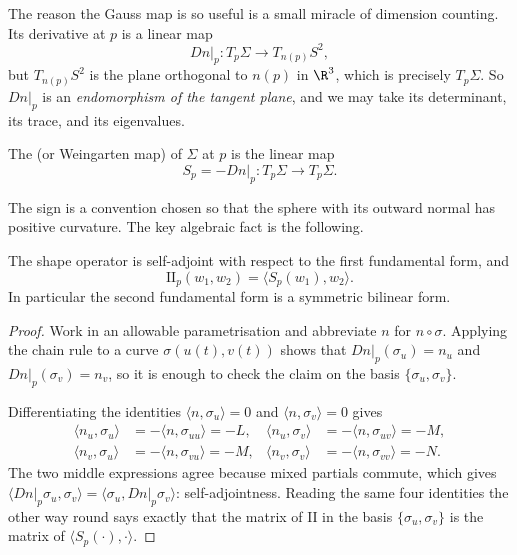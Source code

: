 The reason the Gauss map is so useful is a small miracle of dimension counting. Its derivative at $p$ is a linear map
$$
\left.Dn\right|_p : T_p\Sigma \rightarrow T_{n(p)}S^2,
$$
but $T_{n(p)}S^2$ is the plane orthogonal to $n(p)$ in $\R^3$, which is precisely $T_p\Sigma$. So $\left.Dn\right|_p$ is an \emph{endomorphism of the tangent plane}, and we may take its determinant, its trace, and its eigenvalues.

\begin{definition}
    The  (or Weingarten map) of $\Sigma$ at $p$ is the linear map
    $$
    S_p = -\left.Dn\right|_p : T_p\Sigma \rightarrow T_p\Sigma.
    $$
\end{definition}

The sign is a convention chosen so that the sphere with its outward normal has positive curvature. The key algebraic fact is the following.

\begin{lemma}
    The shape operator is self-adjoint with respect to the first fundamental form, and
    $$
    \mathrm{II}_p(w_1, w_2) = \langle S_p(w_1), w_2\rangle.
    $$
    In particular the second fundamental form is a symmetric bilinear form.
\end{lemma}
\begin{proof}
    Work in an allowable parametrisation and abbreviate $n$ for $n\circ\sigma$. Applying the chain rule to a curve $\sigma(u(t), v(t))$ shows that $\left.Dn\right|_p(\sigma_u) = n_u$ and $\left.Dn\right|_p(\sigma_v) = n_v$, so it is enough to check the claim on the basis $\{\sigma_u, \sigma_v\}$.

    Differentiating the identities $\langle n, \sigma_u\rangle = 0$ and $\langle n, \sigma_v\rangle = 0$ gives
    \begin{align*}
        \langle n_u, \sigma_u\rangle &= -\langle n, \sigma_{uu}\rangle = -L, & \langle n_u, \sigma_v \rangle &= -\langle n, \sigma_{uv}\rangle = -M, \\
        \langle n_v, \sigma_u\rangle &= -\langle n, \sigma_{vu}\rangle = -M, & \langle n_v, \sigma_v \rangle &= -\langle n, \sigma_{vv}\rangle = -N.
    \end{align*}
    The two middle expressions agree because mixed partials commute, which gives $\langle \left.Dn\right|_p \sigma_u, \sigma_v\rangle = \langle \sigma_u, \left.Dn\right|_p\sigma_v\rangle$: self-adjointness. Reading the same four identities the other way round says exactly that the matrix of $\mathrm{II}$ in the basis $\{\sigma_u, \sigma_v\}$ is the matrix of $\langle S_p(\cdot), \cdot\rangle$.
\end{proof}

